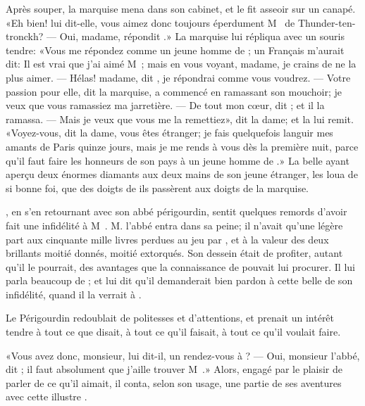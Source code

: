 Après souper, la marquise mena  dans son cabinet, et le fit
asseoir sur un canapé. «Eh bien! lui dit-elle, vous aimez donc toujours
éperdument M~ de Thunder-ten-tronckh? — Oui, madame,
répondit .» La marquise lui répliqua avec un souris tendre: «Vous
me répondez comme un jeune homme de ; un Français m’aurait
dit: Il est vrai que j’ai aimé M~; mais en vous
voyant, madame, je crains de ne la plus aimer. — Hélas! madame, dit
, je répondrai comme vous voudrez. — Votre passion pour elle, dit
la marquise, a commencé en ramassant son mouchoir; je veux que vous
ramassiez ma jarretière. — De tout mon cœur, dit ; et il la
ramassa. — Mais je veux que vous me la remettiez», dit la dame; et 
la lui remit. «Voyez-vous, dit la dame, vous êtes étranger; je fais
quelquefois languir mes amants de Paris quinze jours, mais je me rends
à vous dès la première nuit, parce qu’il faut faire les honneurs de son
pays à un jeune homme de .» La belle ayant aperçu deux énormes
diamants aux deux mains de son jeune étranger, les loua de si bonne
foi, que des doigts de  ils passèrent aux doigts de la marquise.

, en s’en retournant avec son abbé périgourdin, sentit quelques
remords d’avoir fait une infidélité à M~. M. l’abbé
entra dans sa peine; il n’avait qu’une légère part aux cinquante mille
livres perdues au jeu par , et à la valeur des deux brillants
moitié donnés, moitié extorqués. Son dessein était de profiter, autant
qu’il le pourrait, des avantages que la connaissance de  pouvait
lui procurer. Il lui parla beaucoup de ; et  lui dit
qu’il demanderait bien pardon à cette belle de son infidélité, quand il
la verrait à .

Le Périgourdin redoublait de politesses et d’attentions, et prenait un
intérêt tendre à tout ce que  disait, à tout ce qu’il faisait, à
tout ce qu’il voulait faire.

«Vous avez donc, monsieur, lui dit-il, un rendez-vous à ? — Oui,
monsieur l’abbé, dit ; il faut absolument que j’aille trouver
M~.» Alors, engagé par le plaisir de parler de ce
qu’il aimait, il conta, selon son usage, une partie de ses aventures
avec cette illustre  .


